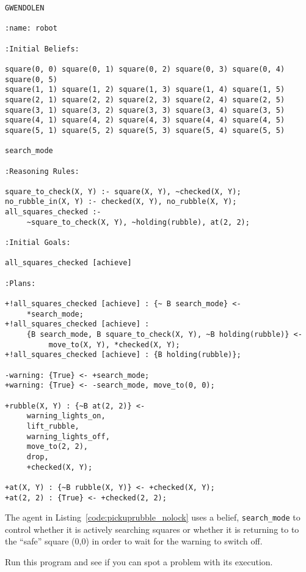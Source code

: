 \documentclass[a4]{article}
\begin{document}
\begin{lstlisting}[float,caption=Picking up Rubble with Warnings,basicstyle=\sffamily,style=easslisting,language=Gwendolen,label=code:pickuprubble_nolock]
GWENDOLEN

:name: robot

:Initial Beliefs:

square(0, 0) square(0, 1) square(0, 2) square(0, 3) square(0, 4) square(0, 5)
square(1, 1) square(1, 2) square(1, 3) square(1, 4) square(1, 5)
square(2, 1) square(2, 2) square(2, 3) square(2, 4) square(2, 5)
square(3, 1) square(3, 2) square(3, 3) square(3, 4) square(3, 5)
square(4, 1) square(4, 2) square(4, 3) square(4, 4) square(4, 5)
square(5, 1) square(5, 2) square(5, 3) square(5, 4) square(5, 5)

search_mode

:Reasoning Rules:

square_to_check(X, Y) :- square(X, Y), ~checked(X, Y);
no_rubble_in(X, Y) :- checked(X, Y), no_rubble(X, Y);
all_squares_checked :- 
     ~square_to_check(X, Y), ~holding(rubble), at(2, 2);

:Initial Goals:

all_squares_checked [achieve]

:Plans:

+!all_squares_checked [achieve] : {~ B search_mode} <- 
     *search_mode;
+!all_squares_checked [achieve] : 
     {B search_mode, B square_to_check(X, Y), ~B holding(rubble)} <- 
          move_to(X, Y), *checked(X, Y);
+!all_squares_checked [achieve] : {B holding(rubble)};

-warning: {True} <- +search_mode;
+warning: {True} <- -search_mode, move_to(0, 0);

+rubble(X, Y) : {~B at(2, 2)} <- 
     warning_lights_on, 
     lift_rubble, 
     warning_lights_off, 
     move_to(2, 2), 
     drop, 
     +checked(X, Y);

+at(X, Y) : {~B rubble(X, Y)} <- +checked(X, Y);
+at(2, 2) : {True} <- +checked(2, 2);
\end{lstlisting}
The agent in Listing~\ref{code:pickuprubble_nolock} uses a belief, \lstinline{search_mode} to control whether it is actively searching squares or whether it is returning to to the ``safe'' square (0,0) in order to wait for the warning to switch off.  

Run this program and see if you can spot a problem with its execution.

\pagebreak
\end{document}
